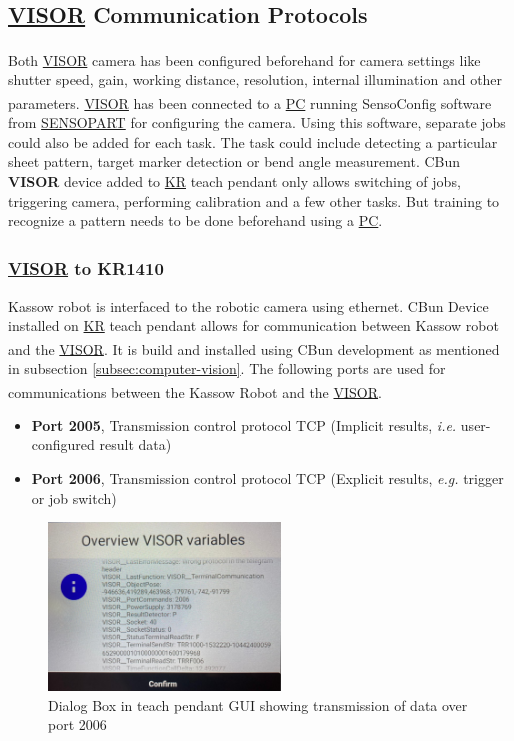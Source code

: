 \subsection{\hyperref[acro:VISOR]{VISOR}\textsuperscript{\textregistered} Communication Protocols}
Both \hyperref[acro:VISOR]{VISOR}\textsuperscript{\textregistered} camera has been configured beforehand for camera settings like shutter speed, gain, working distance, resolution, internal illumination and other parameters. \hyperref[acro:VISOR]{VISOR}\textsuperscript{\textregistered} has been connected to a \hyperref[acro:PC]{PC} running SensoConfig software from \hyperref[acro:SensoPart]{SENSOPART} for configuring the camera.
Using this software, separate jobs could also be added for each task. The task could include detecting a particular sheet pattern, target marker detection or bend angle measurement. CBun \textbf{VISOR} device added to \hyperref[acro:KR]{KR} teach pendant only allows switching of jobs, triggering camera,
performing calibration and a few other tasks. But training to recognize a pattern needs to be done beforehand using a \hyperref[acro:PC]{PC}.

\subsubsection{\hyperref[acro:VISOR]{VISOR}\textsuperscript{\textregistered} to KR1410}
Kassow robot is interfaced to the robotic camera using ethernet.
CBun Device installed on \hyperref[acro:KR]{KR} teach pendant allows for communication between
Kassow robot and the \hyperref[acro:VISOR]{VISOR}\textsuperscript{\textregistered}. It is build and installed using CBun development as mentioned in subsection \ref{subsec:computer-vision}. The following ports are used for communications between the Kassow Robot and the \hyperref[acro:VISOR]{VISOR}\textsuperscript{\textregistered}. 

\begin{itemize}
  \item \textbf{Port 2005}, Transmission control protocol TCP (Implicit results, \textit{i.e.} user-configured result data)
  \item \textbf{Port 2006}, Transmission control protocol TCP (Explicit results, \textit{e.g.} trigger or job switch)
\end{itemize}


\begin{figure}[h]
  \centering
  \includegraphics[width=0.55\textwidth]{figures/visor-cbun-connection.png}
  \caption{Dialog Box in teach pendant GUI showing transmission of data over port 2006}
  \label{fig:cbun-variables}
\end{figure}

